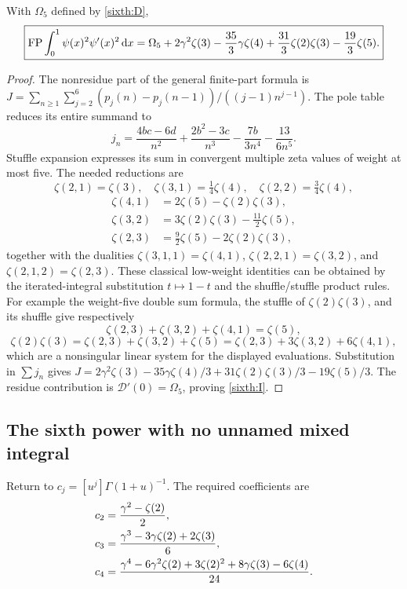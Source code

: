 \begin{proposition}
\label{sixth:mixed}
With $\Omega_5$ defined by \eqref{sixth:D},
\begin{equation}\label{sixth:I}
 \boxed{\displaystyle
 \operatorname{FP}\int_0^1\psi(x)^2\psi'(x)^2\,\mathrm d x
 =\Omega_5+2\gamma^2\zeta(3)-\frac{35}{3}\gamma\zeta(4)
      +\frac{31}{3}\zeta(2)\zeta(3)-\frac{19}{3}\zeta(5).}
\end{equation}
\end{proposition}
\begin{proof}
The nonresidue part of the general finite-part formula is
$J=\sum_{n\ge1}\sum_{j=2}^6
       (p_j(n)-p_j(n-1))/((j-1)n^{j-1})$.
The pole table reduces its entire summand to
\[
 j_n=\frac{4bc-6d}{n^2}+\frac{2b^2-3c}{n^3}
             -\frac{7b}{3n^4}-\frac{13}{6n^5}.
\]
Stuffle expansion expresses its sum in convergent multiple zeta values
of weight at most five.  The needed reductions are
\[
 \zeta(2,1)=\zeta(3),\quad
 \zeta(3,1)=\tfrac14\zeta(4),\quad
 \zeta(2,2)=\tfrac34\zeta(4),
\]
\begin{align*}
 \zeta(4,1)&=2\zeta(5)-\zeta(2)\zeta(3),\\
 \zeta(3,2)&=3\zeta(2)\zeta(3)-\tfrac{11}{2}\zeta(5),\\
 \zeta(2,3)&=\tfrac92\zeta(5)-2\zeta(2)\zeta(3),
\end{align*}
together with the dualities
$\zeta(3,1,1)=\zeta(4,1)$,
$\zeta(2,2,1)=\zeta(3,2)$, and
$\zeta(2,1,2)=\zeta(2,3)$.
These classical low-weight identities can be obtained by the
iterated-integral substitution $t\mapsto1-t$ and the shuffle/stuffle
product rules.  For example the weight-five double sum formula,
the stuffle of $\zeta(2)\zeta(3)$, and its shuffle give respectively
\[
 \zeta(2,3)+\zeta(3,2)+\zeta(4,1)=\zeta(5),
\]
\[
 \zeta(2)\zeta(3)=\zeta(2,3)+\zeta(3,2)+\zeta(5)
                =\zeta(2,3)+3\zeta(3,2)+6\zeta(4,1),
\]
which are a nonsingular linear system for the displayed evaluations.
Substitution in $\sum j_n$ gives
$J=2\gamma^2\zeta(3)-35\gamma\zeta(4)/3
   +31\zeta(2)\zeta(3)/3-19\zeta(5)/3$.
The residue contribution is $\mathcal D'(0)=\Omega_5$, proving
\eqref{sixth:I}.
\end{proof}

\subsection{The sixth power with no unnamed mixed integral}

Return to $c_j=[u^j]\Gamma(1+u)^{-1}$.  The required coefficients are
\begin{align}
 c_2&=\frac{\gamma^2-\zeta(2)}2,\notag\\
 c_3&=\frac{\gamma^3-3\gamma\zeta(2)+2\zeta(3)}6,\label{sixth:cs}\\
 c_4&=\frac{\gamma^4-6\gamma^2\zeta(2)+3\zeta(2)^2
                     +8\gamma\zeta(3)-6\zeta(4)}{24}.\notag
\end{align}

